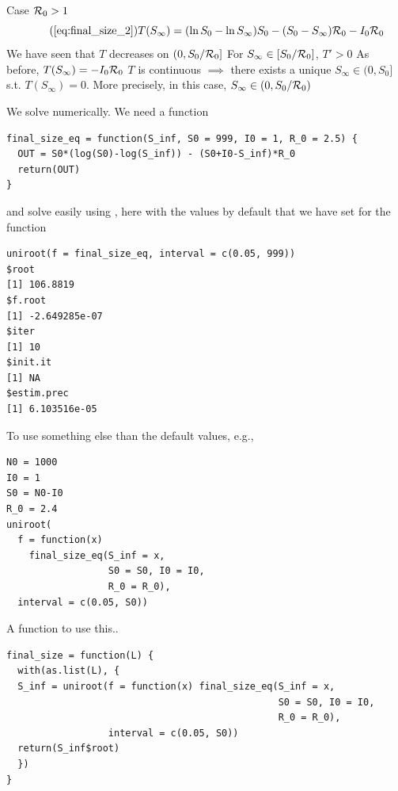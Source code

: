 \documentclass[aspectratio=169]{beamer}\usepackage[]{graphicx}\usepackage[]{xcolor}
\begin{document}
\begin{frame}{Case $\mathcal{R}_0> 1$}
  \begin{equation}\tag{\ref{eq:final_size_2}}
    T(S_\infty) =(\ln S_0-\ln S_\infty)S_0
    - (S_0-S_\infty)\R_0 -I_0\R_0      
  \end{equation}
  \vfill
  \bbullet We have seen that $T$ decreases on $(0,S_0/\mathcal{R}_0]$
  \vfill
  \bbullet For $S_\infty\in[S_0/\mathcal{R}_0]$, $T'>0$
  \vfill
  \bbullet As before, $T(S_\infty)=-I_0\mathcal{R}_0$
  \vfill
  \bbullet $T$ is continuous
  \vfill
  $\implies$ there exists a unique $S_\infty\in (0,S_0]$ s.t. $T(S_\infty)=0$. More precisely, in this case, $S_\infty\in(0,S_0/\mathcal{R}_0)$
\end{frame}




\begin{frame}[fragile]{}
We solve numerically. We need a function
\begin{lstlisting}  
final_size_eq = function(S_inf, S0 = 999, I0 = 1, R_0 = 2.5) {
  OUT = S0*(log(S0)-log(S_inf)) - (S0+I0-S_inf)*R_0
  return(OUT)
}
\end{lstlisting}
and solve easily using , here with the values by default that we have set for the function
\begin{lstlisting}
uniroot(f = final_size_eq, interval = c(0.05, 999))
$root
[1] 106.8819
$f.root
[1] -2.649285e-07
$iter
[1] 10
$init.it
[1] NA
$estim.prec
[1] 6.103516e-05
\end{lstlisting}
\end{frame}


\begin{frame}[fragile]{}
To use something else than the default values, e.g.,
\vfill
\begin{lstlisting}  
N0 = 1000
I0 = 1
S0 = N0-I0
R_0 = 2.4
uniroot(
  f = function(x) 
    final_size_eq(S_inf = x, 
                  S0 = S0, I0 = I0, 
                  R_0 = R_0),
  interval = c(0.05, S0))
\end{lstlisting}
\end{frame}

\begin{frame}[fragile]{A function to use this..}
\begin{lstlisting}
final_size = function(L) {
  with(as.list(L), {
  S_inf = uniroot(f = function(x) final_size_eq(S_inf = x, 
                                                S0 = S0, I0 = I0, 
                                                R_0 = R_0),
                  interval = c(0.05, S0))
  return(S_inf$root)
  })
}
\end{lstlisting}
\end{frame}
\end{document}
